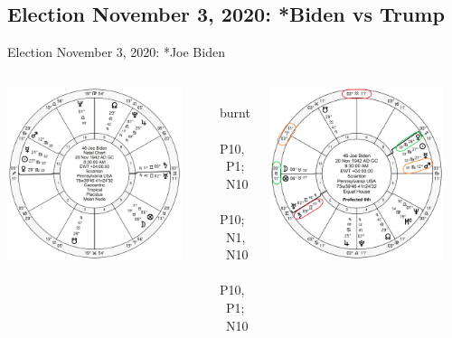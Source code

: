 \subsection{Election November 3, 2020: *Biden vs Trump}
\begin{frame}[t]{Election November 3, 2020: *Joe Biden}
\small

\begin{columns}[T, onlytextwidth]
\vspace{-1em}
{\includegraphics[width=0.9\textwidth]{charts/Biden.png}}
\fontsize{7pt}{8pt}\selectfont

\Venus\, burnt \Square\, P10, \Opposition\, P1; \Sextile\, N10 \\
\Saturn\, \Trine\, P10; \Opposition\, N1, \Square\, N10 \\
\Mars\, \Square\, P10, \Opposition\, P1; \Sextile\, N10

\vspace{-1em}
{\includegraphics[width=0.9\textwidth]{charts/Biden-Prof-6th.png}}
\fontsize{8pt}{9pt}\selectfont


\end{columns}
\end{frame}
